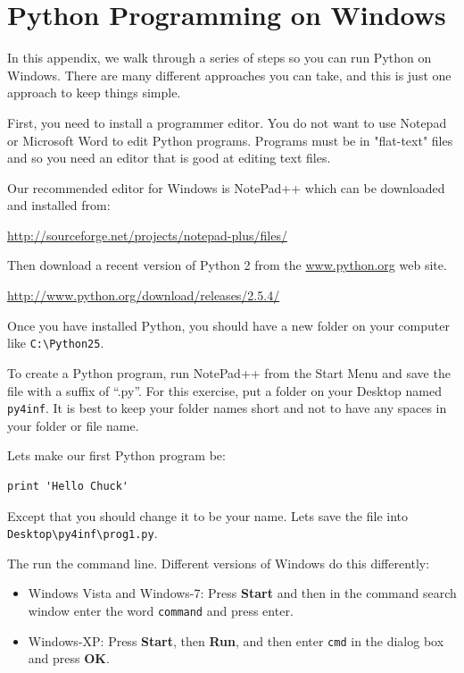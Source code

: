 \documentclass[11pt]{book}
\begin{document}
\appendix

\chapter{Python Programming on Windows}

In this appendix, we walk through a series of steps
so you can run Python on Windows.  There are many different 
approaches you can take, and this is just one
approach to keep things simple.

First, you need to install a programmer editor.  You
do not want to use Notepad or Microsoft Word to edit
Python programs.  Programs must be in "flat-text" files
and so you need an editor that is good at
editing text files.

Our recommended editor for Windows is NotePad++ which
can be downloaded and installed from:

\url{http://sourceforge.net/projects/notepad-plus/files/}

Then download a recent version of Python 2 from the
\url{www.python.org} web site.

\url{http://www.python.org/download/releases/2.5.4/}

Once you have installed Python, you should have a new
folder on your computer like {\tt C:{\textbackslash}Python25}.

To create a Python program, run NotePad++ from the Start Menu
and save the file with a suffix of ``.py''.  For this
exercise, put a folder on your Desktop named 
{\tt py4inf}.  It is best to keep your folder names short
and not to have any spaces in your folder or file name.

Lets make our first Python program be:

\beforeverb
\begin{verbatim}
print 'Hello Chuck'
\end{verbatim}
\afterverb
%
Except that you should change it to be your name.  Lets
save the file into {\tt Desktop{\textbackslash}py4inf{\textbackslash}prog1.py}.

The run the command line.  Different versions of Windows
do this differently:

\begin{itemize}
\item Windows Vista and Windows-7: Press {\bf Start}
and then in the command search window enter the word
{\tt command} and press enter.

\item Windows-XP: Press {\bf Start}, then {\bf Run}, and 
then enter {\tt cmd} in the dialog box and press {\bf OK}.
\end{itemize}
\end{document}

